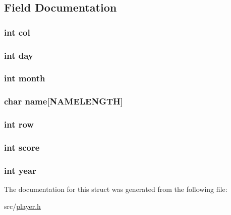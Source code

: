 \subsection{Field Documentation}
\hypertarget{structplayer_afb52e720f5f0c483db5861f9e42e924e}{
\subsubsection[{col}]{\setlength{\rightskip}{0pt plus 5cm}int col}}\label{structplayer_afb52e720f5f0c483db5861f9e42e924e}
\hypertarget{structplayer_a4c11afc03fc3ee49bab660def6558f2a}{
\subsubsection[{day}]{\setlength{\rightskip}{0pt plus 5cm}int day}}\label{structplayer_a4c11afc03fc3ee49bab660def6558f2a}
\hypertarget{structplayer_aedb06abe5aff12fa3e7e0e71a374edfb}{
\subsubsection[{month}]{\setlength{\rightskip}{0pt plus 5cm}int month}}\label{structplayer_aedb06abe5aff12fa3e7e0e71a374edfb}
\hypertarget{structplayer_ade40c7dcb824cf7ccf1d12f56df289e7}{
\subsubsection[{name}]{\setlength{\rightskip}{0pt plus 5cm}char name\mbox{[}{\bf N\-A\-M\-E\-L\-E\-N\-G\-T\-H}\mbox{]}}}\label{structplayer_ade40c7dcb824cf7ccf1d12f56df289e7}
\hypertarget{structplayer_af1d3cff2e4538e23400e260bae3dadad}{
\subsubsection[{row}]{\setlength{\rightskip}{0pt plus 5cm}int row}}\label{structplayer_af1d3cff2e4538e23400e260bae3dadad}
\hypertarget{structplayer_aef160b7437d94056f1dc59646cd5b87d}{
\subsubsection[{score}]{\setlength{\rightskip}{0pt plus 5cm}int score}}\label{structplayer_aef160b7437d94056f1dc59646cd5b87d}
\hypertarget{structplayer_abeac221e38b7b9ce7df8722c842bf671}{
\subsubsection[{year}]{\setlength{\rightskip}{0pt plus 5cm}int year}}\label{structplayer_abeac221e38b7b9ce7df8722c842bf671}


The documentation for this struct was generated from the following file\-:\begin{DoxyCompactItemize}
\item 
src/\hyperlink{player_8h}{player.\-h}\end{DoxyCompactItemize}
